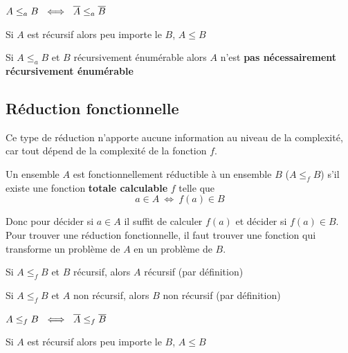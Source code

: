 \begin{myprop}
	$A \leq_a B \ \iff \ \overline{A} \leq_a \overline{B}$
\end{myprop}

\begin{myprop}
	Si $A$ est récursif alors peu importe le $B$, $A \leq B$
\end{myprop}

\begin{myprop}
	Si $A \leq_a B$ et $B$ récursivement énumérable alors $A$ n'est
	\textbf{pas nécessairement récursivement énumérable}
\end{myprop}

\subsection{Réduction fonctionnelle}
Ce type de réduction n'apporte aucune information au niveau de la complexité,
car tout dépend de la complexité de la fonction $f$.

\begin{mydef}
	Un ensemble $A$ est fonctionnellement réductible à un ensemble $B$
	($A\leq_f B$) s’il existe une fonction \textbf{totale calculable} $f$
	telle que
	\[ a\in A \ \iff \ f(a) \in B \]
\end{mydef}

\begin{myrem}
	Donc pour décider si $a\in A$ il suffit de calculer $f(a)$ et décider si
	$f(a) \in B$. Pour trouver une réduction fonctionnelle, il faut trouver
	une fonction qui transforme un problème de $A$ en un problème de $B$.
\end{myrem}

\begin{myprop}
	Si $A \leq_f B$ et $B$ récursif, alors $A$ récursif (par définition)
\end{myprop}

\begin{myprop}
	Si $A \leq_f B$ et $A$ non récursif, alors $B$ non récursif (par définition)
\end{myprop}

\begin{myprop}
	$A \leq_f B \ \iff \ \overline{A} \leq_f \overline{B}$
\end{myprop}

\begin{myprop}
	Si $A$ est récursif alors peu importe le $B$, $A \leq B$
\end{myprop}

